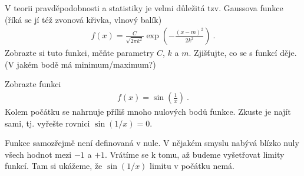 \begin{exercise}
    V teorii pravděpodobnosti a statistiky je velmi důležitá tzv. Gaussova funkce (říká se jí též zvonová křivka, vlnový balík)
    \begin{align}
        f(x) = \frac{C}{\sqrt{2 \pi k^2}} \exp \left( - \frac{(x-m)^2}{2k^2}\right) \:.
    \end{align}
    Zobrazte si tuto funkci, měňte parametry $C$, $k$ a $m$. Zjišťujte, co se s funkcí děje. (V jakém bodě má minimum/maximum?)
\end{exercise}

\begin{exercise}
    Zobrazte funkci \begin{align}
        f(x) = \sin \left( \frac{1}{x} \right) \:.
    \end{align}
    Kolem počátku se nahrnuje příliš mnoho nulových bodů funkce. Zkuste je najít sami, tj. vyřešte rovnici $\sin(1/x) = 0$. 
    
    Funkce samozřejmě není definovaná v nule. V nějakém smyslu nabývá blízko nuly všech hodnot mezi $-1$ a $+1$. Vrátíme se k tomu, až budeme vyšetřovat limity funkcí. Tam si ukážeme, že $\sin(1/x)$ limitu v počátku nemá.
\end{exercise}